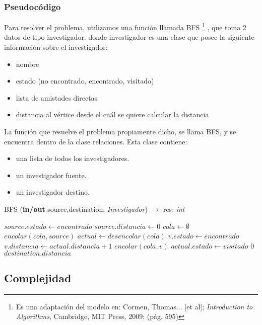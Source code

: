 \subsubsection{Pseudocódigo}

\indent Para resolver el problema, utilizamos una función  llamada BFS \footnote{Es una adaptación del modelo en: Cormen, Thomas... [et al]; \textit{Introduction to Algorithms}, Cambridge, MIT Press, 2009; (p\'ag. 595)}
, que toma
2 datos de tipo investigador. donde investigador es una clase que posee la
siguiente información sobre el investigador:
\begin{itemize}
	\item nombre
	\item estado (no encontrado, encontrado, visitado)
	\item lista de amistades directas
	\item distancia al vértice desde el cuál se quiere calcular la distancia
\end{itemize}
\indent La función que resuelve el problema propiamente dicho, se llama BFS, y
se encuentra dentro de la clase relaciones. Esta clase contiene:
\begin{itemize}
\item una lista de todos los investigadores.
\item un investigador fuente.
\item un investigador destino.
\end{itemize}

\begin{algorithm}
\caption{BFS (\textbf{in/out} source,destination: \textsl{Investigador}) $\rightarrow$ res: \textsl{int}}
\begin{algorithmic}[1]

\STATE $source.estado \leftarrow encontrado$
\STATE $source.distancia \leftarrow 0$
\STATE $cola \leftarrow \emptyset$
\STATE $encolar(cola,source)$
	\STATE $actual \leftarrow desencolar(cola)$
			\STATE $v.estado \leftarrow encontrado$
			\STATE $v.distancia \leftarrow actual.distancia + 1$
			\STATE $encolar(cola,v)$
		\ENDIF
	\ENDFOR
	\STATE $actual.estado \leftarrow visitado$
\ENDWHILE
{}
	\RETURN $0$
\ELSE
	\RETURN $destination.distancia$
\ENDIF
\end{algorithmic}
\end{algorithm}

\subsection{Complejidad}
